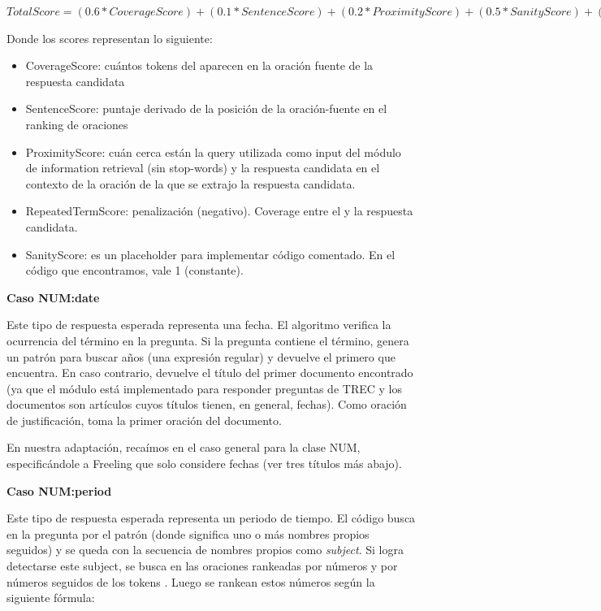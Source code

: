 $TotalScore = (0.6 * CoverageScore) + (0.1 * SentenceScore) + (0.2 * ProximityScore)	+ (0.5 * SanityScore) + (0.3 * RepeatedTermScore)$ \newline

Donde los scores representan lo siguiente:
\begin{itemize}
  \item CoverageScore: cuántos tokens del  aparecen en la oración fuente de la respuesta candidata
  \item SentenceScore: puntaje derivado de la posición de la oración-fuente en el ranking de oraciones
  \item ProximityScore: cuán cerca están la query utilizada como input del módulo de information retrieval (sin stop-words) y la respuesta candidata en el contexto de la oración de la que se extrajo la respuesta candidata.
  \item RepeatedTermScore: penalización (negativo). Coverage entre el  y la respuesta candidata.
  \item SanityScore: es un placeholder para implementar código comentado. En el código que encontramos, vale 1 (constante).
\end{itemize}


\textbf{Caso NUM:date} \newline

Este tipo de respuesta esperada representa una fecha. El algoritmo verifica la ocurrencia del término  en la pregunta. Si la pregunta contiene el término, genera un patrón para buscar años (una expresión regular) y devuelve el primero que encuentra. En caso contrario, devuelve el título del primer documento encontrado (ya que el módulo está implementado para responder preguntas de TREC y los documentos son artículos cuyos títulos tienen, en general, fechas). Como oración de justificación, toma la primer oración del documento.

En nuestra adaptación, recaímos en el caso general para la clase NUM, especificándole a Freeling que solo considere fechas (ver tres títulos más abajo).\newline

\textbf{Caso NUM:period} \newline

Este tipo de respuesta esperada representa un periodo de tiempo. El código busca en la pregunta por el patrón  (donde  significa uno o más nombres propios seguidos) y se queda con la secuencia de nombres propios como \textit{subject}.
Si logra detectarse este subject, se busca en las oraciones rankeadas por números y por números seguidos de los tokens . Luego se rankean estos números según la siguiente fórmula:\newline

